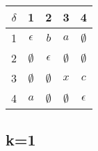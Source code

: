 \documentclass{article}
\begin{document}
\begin{center}
\begin{tabular}{c||*{3}{c|}c}
$\delta$ & 1 & 2 & 3 & 4 \\
  \hline \hline
1 & $\epsilon$  & $b$         & $a$         & $\emptyset$ \\ \hline
2 & $\emptyset$ & $\epsilon$  & $\emptyset$ & $\emptyset$ \\ \hline
3 & $\emptyset$ & $\emptyset$ & $x$         & $c$         \\ \hline
4 & $a$         & $\emptyset$ & $\emptyset$ & $\epsilon$  \\
\end{tabular}
\end{center}

\subsection*{k=1}
\end{document}
